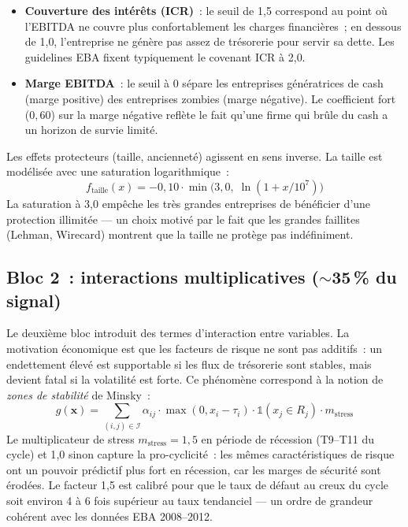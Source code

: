 \documentclass[12pt, a4paper, twoside, openright]{report}
\theoremstyle{definition}
\begin{document}
\begin{itemize}[nosep]
  \item \textbf{Couverture des intérêts (ICR)}~: le seuil de 1{,}5 correspond au point où l'EBITDA ne couvre plus confortablement les charges financières~; en dessous de 1{,}0, l'entreprise ne génère pas assez de trésorerie pour servir sa dette. Les guidelines EBA fixent typiquement le covenant ICR à 2{,}0.
  \item \textbf{Marge EBITDA}~: le seuil à 0 sépare les entreprises génératrices de cash (marge positive) des entreprises zombies (marge négative). Le coefficient fort ($0{,}60$) sur la marge négative reflète le fait qu'une firme qui brûle du cash a un horizon de survie limité.
\end{itemize}

Les effets protecteurs (taille, ancienneté) agissent en sens inverse. La taille est modélisée avec une saturation logarithmique~:
%
\begin{equation}
f_{\text{taille}}(x) = -0{,}10 \cdot \min\!\bigl(3{,}0,\; \ln(1 + x/10^7)\bigr)
\end{equation}
%
La saturation à 3{,}0 empêche les très grandes entreprises de bénéficier d'une protection illimitée --- un choix motivé par le fait que les grandes faillites (Lehman, Wirecard) montrent que la taille ne protège pas indéfiniment.

\subsection{Bloc 2~: interactions multiplicatives ($\sim$35\,\% du signal)}

Le deuxième bloc introduit des termes d'interaction entre variables.
La motivation économique est que les facteurs de risque ne sont pas additifs~: un endettement élevé est supportable si les flux de trésorerie sont stables, mais devient fatal si la volatilité est forte.
Ce phénomène correspond à la notion de \emph{zones de stabilité} de Minsky~:
%
\begin{equation}
\label{eq:bloc2}
g(\mathbf{x}) = \sum_{(i,j) \in \mathcal{I}} \alpha_{ij} \cdot \max(0, x_i - \tau_i) \cdot \mathbb{1}(x_j \in R_j) \cdot m_{\text{stress}}
\end{equation}
%
Le multiplicateur de stress $m_{\text{stress}} = 1{,}5$ en période de récession (T9--T11 du cycle) et 1{,}0 sinon capture la pro-cyclicité~: les mêmes caractéristiques de risque ont un pouvoir prédictif plus fort en récession, car les marges de sécurité sont érodées.
Le facteur 1{,}5 est calibré pour que le taux de défaut au creux du cycle soit environ 4 à 6 fois supérieur au taux tendanciel --- un ordre de grandeur cohérent avec les données EBA 2008--2012.
\end{document}

